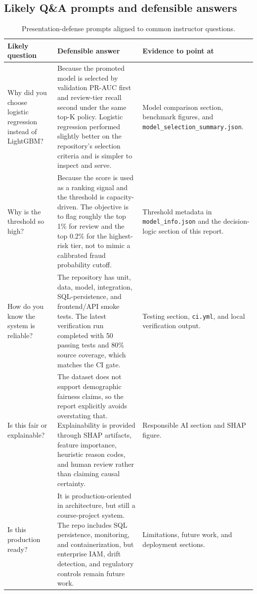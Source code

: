 \documentclass[11pt]{article}
\newcommand{\code}[1]{\texttt{#1}}
\begin{document}
\subsection*{Likely Q\&A prompts and defensible answers}
\begin{table}[H]
\small
\centering
\begin{tabularx}{\textwidth}{p{}p{}X}
\toprule
Likely question & Defensible answer & Evidence to point at \\
\midrule
Why did you choose logistic regression instead of LightGBM? & Because the promoted model is selected by validation PR-AUC first and review-tier recall second under the same top-K policy. Logistic regression performed slightly better on the repository's selection criteria and is simpler to inspect and serve. & Model comparison section, benchmark figures, and \code{model\_selection\_summary.json}. \\
Why is the threshold so high? & Because the score is used as a ranking signal and the threshold is capacity-driven. The objective is to flag roughly the top 1\% for review and the top 0.2\% for the highest-risk tier, not to mimic a calibrated fraud probability cutoff. & Threshold metadata in \code{model\_info.json} and the decision-logic section of this report. \\
How do you know the system is reliable? & The repository has unit, data, model, integration, SQL-persistence, and frontend/API smoke tests. The latest verification run completed with 50 passing tests and 80\% source coverage, which matches the CI gate. & Testing section, \code{ci.yml}, and local verification output. \\
Is this fair or explainable? & The dataset does not support demographic fairness claims, so the report explicitly avoids overstating that. Explainability is provided through SHAP artifacts, feature importance, heuristic reason codes, and human review rather than claiming causal certainty. & Responsible AI section and SHAP figure. \\
Is this production ready? & It is production-oriented in architecture, but still a course-project system. The repo includes SQL persistence, monitoring, and containerization, but enterprise IAM, drift detection, and regulatory controls remain future work. & Limitations, future work, and deployment sections. \\
\bottomrule
\end{tabularx}
\caption{Presentation-defense prompts aligned to common instructor questions.}
\end{table}
\end{document}
